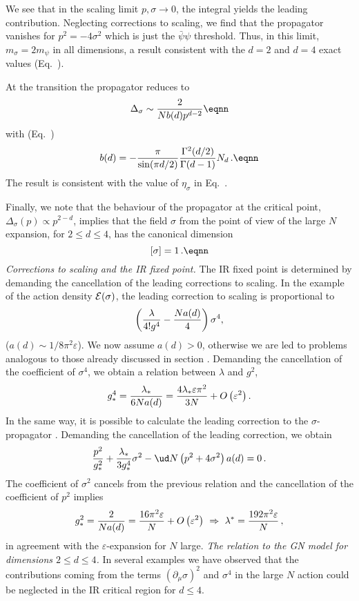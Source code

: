 We see that in the scaling limit $p,\sigma\to 0$, the integral yields the
leading contribution. Neglecting corrections to scaling, we find that
the propagator vanishes for $p^2=-4\sigma^2$ which is
just the $\bar\psi\psi$  threshold. Thus, in this limit,  $m_{\sigma}=2
m_{\psi}$ in all dimensions, a result consistent with the $d=2$ and $d=4$ exact
values (Eq.~\eqns{\eGNspec,\emassratio}).\par
At the transition the propagator reduces to
$$\Delta_\sigma\sim {2 \over N b(d)  p^{d-2}} \eqnn
$$
with (Eq.~\econstb)
$$ b(d)=-{\pi \over\sin(\pi d/2)}
{\Gamma^2 (d/ 2) \over \Gamma (d-1)}N_d \,. \eqnn $$ The result is
consistent with the value of $\eta_{\sigma}$ in Eq.~\eGNNnu.
\par Finally, we note that the behaviour of the propagator at the
critical point, $\Delta_\sigma(p) \propto p^{2-d}$, implies that
the field $\sigma$ from the point of view of the large $N$
expansion, for $2\le d\le 4$, has the canonical dimension
$$[\sigma]=1\,. \eqnn $$
\medskip
{\it Corrections to scaling and the IR fixed point.}  The IR fixed point is
determined by demanding the cancellation of the leading corrections to
scaling. In the example of the action density ${\cal E}(\sigma)$, the leading correction to scaling is proportional to
$$\left({\lambda\over4! g^4}-{N a(d)\over 4}\right)\sigma^4 ,$$
($ a(d)\sim{1 / 8\pi^{2}\varepsilon}
$).
We now assume $a(d)>0$, otherwise we are led to problems analogous to those already discussed in section \sssEGRN. Demanding the
cancellation of the coefficient of $\sigma^4$, we obtain a relation between
$\lambda$ and $g^2$,
$$ g_*^4={\lambda_*\over 6N a(d)}
={4\lambda_*\varepsilon \pi^2\over 3N}+O\left(\varepsilon^2\right).$$
In the same way, it is possible to calculate the leading correction to the
$\sigma$-propagator \eGNsigprop. Demanding the cancellation of the leading
correction, we obtain
$${p^2\over g^2_*}+{\lambda_* \over3g_*^4}\sigma^2 -\ud N
\left(p^2+4\sigma^2\right)a(d)=0\,.$$
The coefficient of $\sigma^2$ cancels from the previous relation and
the cancellation of the coefficient of $p^2$ implies
$$g_*^2={2\over Na(d)}
={16\pi^2\varepsilon\over N}
+O\left(\varepsilon^2\right) \ \Rightarrow \
\lambda ^*={192 \pi^2 \varepsilon \over N}\,,$$
in agreement with the $\varepsilon$-expansion for $N$ large.
\medskip
{\it  The relation to the GN model for dimensions $2\le d\le 4$.}
In several examples we have observed that the contributions coming
from the terms $(\partial_{\mu}\sigma)^2$ and $\sigma^4$ in the large
$N$ action could be neglected in the IR critical region for $d\le 4$.
